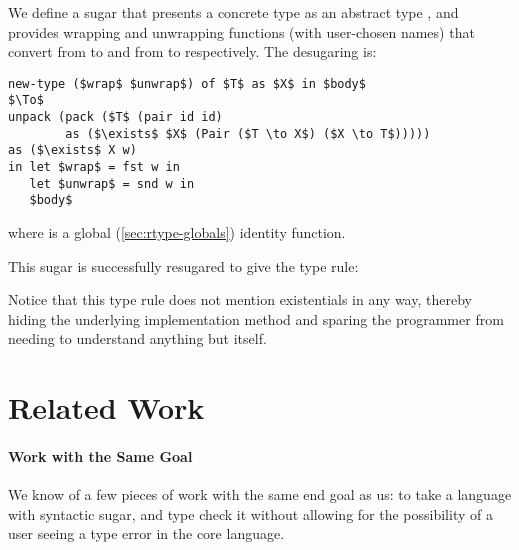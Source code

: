 \begin{prooftree}
\end{prooftree}

We define a  sugar that presents a concrete type 
as an abstract type , and provides wrapping and unwrapping
functions (with user-chosen names) that convert from
 to  and from  to  respectively. The desugaring is:
\begin{lstlisting}
new-type ($wrap$ $unwrap$) of $T$ as $X$ in $body$
$\To$
unpack (pack ($T$ (pair id id)
        as ($\exists$ $X$ (Pair ($T \to X$) ($X \to T$)))))
as ($\exists$ X w)
in let $wrap$ = fst w in
   let $unwrap$ = snd w in
   $body$
\end{lstlisting}
where  is a global (\cref{sec:rtype-globals})
identity function.

This sugar is successfully resugared to give the type rule:

\begin{prooftree}
\end{prooftree}
Notice that this type rule does not mention existentials in any way,
thereby hiding the underlying implementation method and sparing the
programmer from needing to understand anything but  itself.



\section{Related Work}
\label{s:rtype-relwork}


\paragraph{Work with the Same Goal}

We know of a few pieces of work with the same end goal as us: to take a
language with syntactic sugar, and type check it without allowing for
the possibility of a user seeing a type error in the core language.

